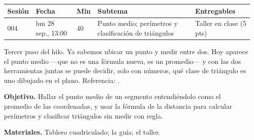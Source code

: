 \documentclass[11pt]{article}
\begin{document}
\encabezado*

\begin{center}
{\renewcommand{\arraystretch}{1.3}
\begin{tabularx}{\linewidth}{@{}l l l X l@{}}
  \toprule
  \textbf{Sesión} & \textbf{Fecha} & \textbf{Min} & \textbf{Subtema} & \textbf{Entregables}\\
  \midrule
  004 & lun 28 sep., 13:00 & 40 & Punto medio; perímetros y clasificación de triángulos
      & Taller en clase (5 pts)\\
  \bottomrule
\end{tabularx}}
\end{center}

Tercer paso del hilo. Ya sabemos ubicar un punto y medir entre dos. Hoy aparece el punto medio
—que no es una fórmula nueva, es un promedio— y con las dos herramientas juntas se puede
decidir, solo con números, qué clase de triángulo es uno dibujado en el plano. Referencia:
.


\textbf{Objetivo.} Hallar el punto medio de un segmento entendiéndolo como el promedio de las
coordenadas, y usar la fórmula de la distancia para calcular perímetros y clasificar
triángulos sin medir con regla.

\textbf{Materiales.} Tablero cuadriculado; la guía; el taller.
\end{document}
